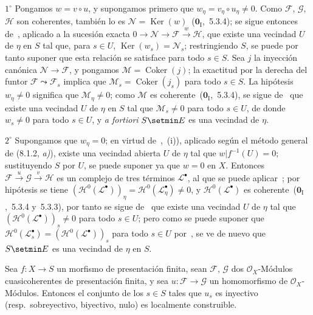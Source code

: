 $1^\circ$ Pongamos $w=v\circ u$, y supongamos primero que $w_\eta=v_\eta\circ u_\eta\neq0$.
Como $\mathcal F$, $\mathcal G$, $\mathcal H$ son coherentes, también lo es $\mathcal N=\operatorname{Ker}(w)$~($\mathbf{0}_{\mathrm{I}}$,~5.3.4); se sigue entonces de~, aplicado a la sucesión exacta $0\to\mathcal N\to\mathcal F\xrightarrow{w}\mathcal H$, que existe una vecindad $U$ de $\eta$ en $S$ tal que, para $s\in U$, $\operatorname{Ker}(w_s)=\mathcal N_s$; restringiendo $S$, se puede por tanto suponer que esta relación se satisface para todo $s\in S$.
Sea $j$ la inyección canónica $\mathcal N\to\mathcal F$, y pongamos $\mathcal M=\operatorname{Coker}(j)$; la exactitud por la derecha del funtor $\mathcal F\leadsto\mathcal F_s$ implica que $\mathcal M_s=\operatorname{Coker}(j_s)$ para todo $s\in S$.
La hipótesis $w_\eta\neq0$ significa que $\mathcal M_\eta\neq0$; como $\mathcal M$ es coherente~($\mathbf{0}_{\mathrm{I}}$,~5.3.4), se sigue de~ que existe una vecindad $U$ de $\eta$ en $S$ tal que $\mathcal M_s\neq0$ para todo $s\in U$, de donde $w_s\neq0$ para todo $s\in U$, y \emph{a fortiori} $S\setmin E$ es una vecindad de $\eta$.

$2^\circ$ Supongamos que $w_\eta=0$; en virtud de~,~(i)), aplicado según el método general de (8.1.2, \emph{a)}), existe una vecindad abierta $U$ de $\eta$ tal que $w|f^{-1}(U)=0$; sustituyendo $S$ por $U$, se puede suponer ya que $w=0$ en $X$.
Entonces $\mathcal F\xrightarrow{u}\mathcal G\xrightarrow{v}\mathcal H$ es un complejo de tres términos $\mathcal L^\bullet$, al que se puede aplicar~; por hipótesis se tiene $(\mathcal H^0(\mathcal L^\bullet))_\eta=
\mathcal H^0(\mathcal L^\bullet_\eta)\neq0$, y $\mathcal H^0(\mathcal L^\bullet)$ es coherente~($\mathbf{0}_{\mathrm{I}}$,~5.3.4 y~5.3.3), por tanto se sigue de~ que existe una vecindad $U$ de $\eta$ tal que $(\mathcal H^0(\mathcal L^\bullet))_s\neq0$ para todo $s\in U$; pero como se puede suponer que $\mathcal H^0(\mathcal L_s^\bullet)=(\mathcal H^0(\mathcal L^\bullet))_s$ para todo $s\in U$ por~, se ve de nuevo que $S\setmin E$ es una vecindad de $\eta$ en $S$.


\begin{corollary}[9.4.5]
\label{IV.9.4.5}
Sea $f:X\to S$ un morfismo de presentación finita, sean $\mathcal F$, $\mathcal G$ dos $\mathcal O_X$-Módulos cuasicoherentes de presentación finita, y sea $u:\mathcal F\to\mathcal G$ un homomorfismo de $\mathcal O_X$-Módulos.
Entonces el conjunto de los $s\in S$ tales que $u_s$ es inyectivo \textnormal{(resp.}\ sobreyectivo, biyectivo, nulo\textnormal{)} es localmente construible.
\end{corollary}

